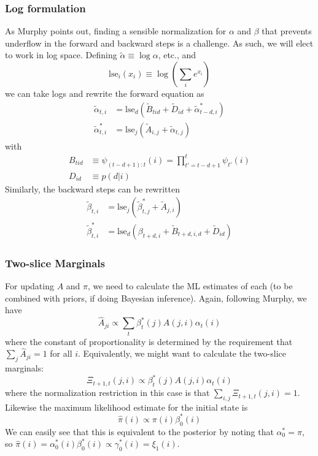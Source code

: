 \documentclass[11pt]{article}
\begin{document}
\subsubsection{Log formulation}
As Murphy points out, finding a sensible normalization for $\alpha$ and $\beta$ that prevents underflow in the forward and backward steps is a challenge. As such, we will elect to work in log space. Defining $\tilde{\alpha} \equiv \log \alpha$, etc., and
\begin{equation}
    \mathrm{lse}_i(x_i) \equiv \log \left( 
    \sum_i e^{x_i}
    \right)
\end{equation}
we can take logs and rewrite the forward equation as
\begin{align}
    \tilde{\alpha}_{t, i} &= \mathrm{lse}_d(\tilde{B}_{tid} + \tilde{D}_{id} + \tilde{\alpha}^*_{t - d, i}) \\
    \tilde{\alpha}^*_{t, i} &= \mathrm{lse}_j(\tilde{A}_{i, j} + \tilde{\alpha}_{t, j})
\end{align}
with 
\begin{align}
    B_{tid} &\equiv \psi_{(t-d+1):t}(i) = \prod_{t' = t - d + 1}^{t} \psi_{t'}(i)\\
    D_{id} &\equiv p(d|i)
\end{align}
Similarly, the backward steps can be rewritten
\begin{align}
    \tilde{\beta}_{t, i} &= \mathrm{lse}_j (\tilde{\beta}^*_{t, j} + \tilde{A}_{j, i}) \\
    \tilde{\beta}^*_{t, i} &= \mathrm{lse}_d (\beta_{t + d, i} + 
    \tilde{B}_{t + d, i, d} + \tilde{D}_{id})
\end{align}

\subsubsection{Two-slice Marginals}
For updating $A$ and $\pi$, we need to calculate the ML estimates of each (to be combined with priors, if doing Bayesian inference). Again, following Murphy, we have
\begin{equation}
    \hat{A}_{ji} \propto \sum_t \beta^*_t(j) A(j, i) \alpha_t(i) 
\end{equation}
where the constant of proportionality is determined by the requirement that $\sum_j \hat{A}_{ji} = 1$ for all $i$.
Equivalently, we might want to calculate the two-slice marginals:
\begin{equation}
    \Xi_{t+1, t}(j, i) \propto \beta^*_t(j) A(j, i) \alpha_t(i)
\end{equation}
where the normalization restriction in this case is that $\sum_{i, j} \Xi_{t + 1, t} (j, i) = 1$. Likewise the maximum likelihood estimate for the initial state is
\begin{equation}
    \hat{\pi}(i) \propto \pi(i) \beta^*_0(i)
\end{equation}
We can easily see that this is equivalent to the posterior by noting that $\alpha_0^* = \pi$, so $\hat{\pi}(i) = \alpha_0^*(i) \beta^*_0(i) \propto \gamma^*_0(i) = \xi_1(i)$. 
\end{document}
